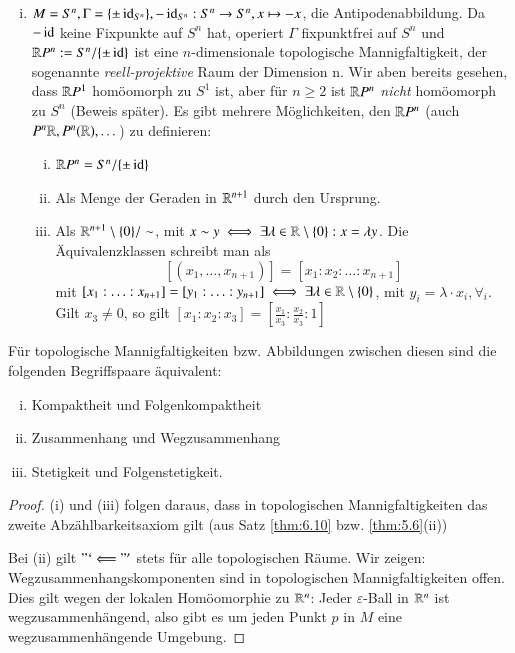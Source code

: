 \documentclass[a4paper,10pt]{scrartcl}
\newcommand{\eps}{\varepsilon}
\begin{document}
\begin{exs*}
 \begin{enumerate}[(i)]
  \item $M=S^n, \Gamma=\{\pm \operatorname{id}_{S^n}\}, -\operatorname{id}_{S^n}: S^n\to S^n, x\mapsto -x$, die Antipodenabbildung. Da $-\operatorname{id}$ keine Fixpunkte 
auf $S^n$ hat, operiert $\Gamma$ fixpunktfrei auf $S^n$ und $\mathbb{R} P^n := S^n/\{\pm \operatorname{id}\}$ ist eine $n$-dimensionale topologische Mannigfaltigkeit,
 der sogenannte \emph{reell-projektive} Raum der Dimension n. Wir aben bereits gesehen, dass $\mathbb{R} P^1$ homöomorph zu $S^1$ ist, aber für $n \geq 2$ ist $\mathbb{R} P^n$ \emph{nicht} homöomorph zu $S^n$ (Beweis später). Es gibt mehrere Möglichkeiten, den $\mathbb{R} P^n$ (auch $P^n \mathbb{R}, P^n(\mathbb{R}), \dotsc$) zu definieren:
\begin{enumerate}[(i)]
\item $\mathbb{R} P^n=S^n/\{\pm\operatorname{id}\}$ 
\item Als Menge der Geraden in $\mathbb{R}^{n+1}$ durch den Ursprung.
\item Als $\mathbb{R}^{n+1}\setminus \{0\}/\sim$, mit $x\sim y \iff \exists \lambda\in \mathbb{R}\setminus\{0\}: x=\lambda y$. Die Äquivalenzklassen schreibt man als 
\[
[(x_1,\dotsc,x_{n+1})]=[x_1:x_2:\dotsc: x_{n+1}] 
\]
mit $[x_1:\dotsc:x_{n+1}]=[y_1:\dotsc:y_{n+1}]\iff \exists \lambda\in \mathbb{R}\setminus\{0\}$, mit $y_i=\lambda\cdot x_i, \forall_i$.
Gilt $x_3\neq 0$, so gilt $[x_1:x_2:x_3]=[\frac{x_1}{x_3}:\frac{x_2}{x_3}:1]$
\begin{figure}[H]
\centering
 \fixme[fig34]
\caption{}
\end{figure}
\end{enumerate}  
\end{enumerate}
\end{exs*}
\begin{st}
 Für topologische Mannigfaltigkeiten bzw. Abbildungen zwischen diesen sind die folgenden Begriffspaare äquivalent:
\begin{enumerate}[(i)]
 \item Kompaktheit und Folgenkompaktheit
 \item Zusammenhang und Wegzusammenhang
 \item Stetigkeit und Folgenstetigkeit.
\end{enumerate}
\end{st}
\begin{figure}[H]
\centering
 \fixme[fig35]
\caption{}
\end{figure}
\begin{proof}
 (i) und (iii) folgen daraus, dass in topologischen Mannigfaltigkeiten das zweite Abzählbarkeitsaxiom gilt (aus Satz \ref{thm:6.10} bzw. \ref{thm:5.6}(ii))

Bei (ii) gilt $"`\Longleftarrow"'$ stets für alle topologischen Räume. Wir zeigen: Wegzusammenhangskomponenten sind in topologischen Mannigfaltigkeiten offen. Dies gilt wegen der lokalen Homöomorphie zu $\mathbb{R}^n$:
Jeder $\eps$-Ball in $\mathbb{R}^n$ ist wegzusammenhängend, also gibt es um jeden Punkt $p$ in $M$ eine wegzusammenhängende Umgebung.
\end{proof}
\end{document}
